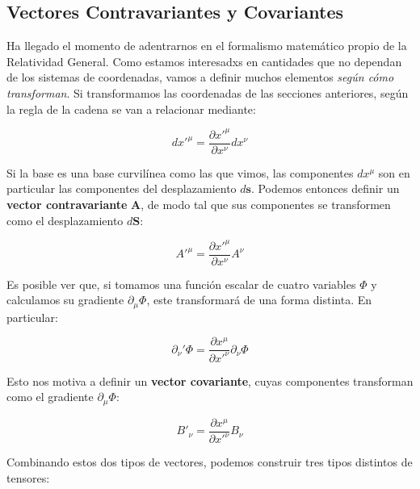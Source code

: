 \subsection*{\textbf{Vectores Contravariantes y Covariantes}}

Ha llegado el momento de adentrarnos en el formalismo matemático propio de la Relatividad General. Como estamos interesadxs en cantidades que no dependan de los sistemas de coordenadas, vamos a definir muchos elementos \textit{según cómo transforman}. Si transformamos las coordenadas de las secciones anteriores, según la regla de la cadena se van a relacionar mediante:

\begin{equation}
    dx'^\mu=\frac{\partial x'^\mu}{\partial x^\nu}d x^\nu
\end{equation}

Si la base es una base curvilínea como las que vimos, las componentes $dx^\mu$ son en particular las componentes del desplazamiento $d\mathbf{s}$. Podemos entonces definir un \textbf{vector contravariante} $\mathbf{A}$, de modo tal que sus componentes se transformen como el desplazamiento $d\mathbf{S}$:

\begin{equation}
    A'^\mu=\frac{\partial x'^\mu}{\partial x^\nu}A^\nu
\end{equation}

Es posible ver que, si tomamos una función escalar de cuatro variables $\Phi$ y calculamos su gradiente $\partial_\mu \Phi$, este transformará de una forma distinta. En particular:

\begin{equation}
    \partial_\nu ' \Phi = \frac{\partial x^\mu}{\partial x'^\nu}\partial_{\nu}\Phi 
\end{equation}

Esto nos motiva a definir un \textbf{vector covariante}, cuyas componentes transforman como el gradiente $\partial_\mu \Phi$:

\begin{equation}
    B'_{\nu} = \frac{\partial x^\mu}{\partial x'^\nu}B_{\nu} 
\end{equation}

Combinando estos dos tipos de vectores, podemos construir tres tipos distintos de tensores:

